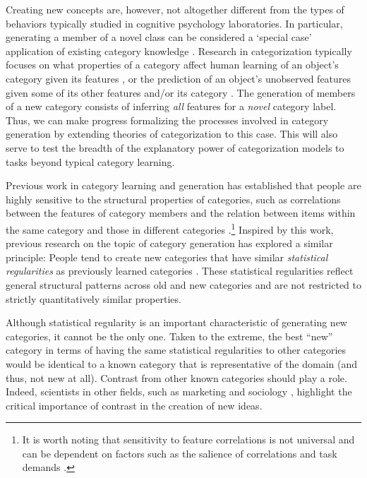 \documentclass[pdflatex,sn-apa]{sn-jnl}%
\theoremstyle{thmstyleone}%
\theoremstyle{thmstyletwo}%
\theoremstyle{thmstylethree}%
\begin{document}
Creating new concepts are, however, not altogether different from
the types of behaviors typically studied in cognitive psychology laboratories.
In particular, generating a member of a novel class can be considered a `special
case' application of existing category knowledge
\citep{kemp2014taxonomy,kurtz2015human}. Research in categorization typically
focuses on what properties of a category affect human learning of an object's
category given its features \citep{shepard1961learning,kurtz2013human}, or the
prediction of an object's unobserved features given some of its other features
and/or its category \citep{markman2003category}. The generation of members of a
new category consists of inferring {\em all} features for a {\em novel} category
label. Thus, we can make progress formalizing the processes involved in category
generation by extending theories of categorization to this case. This will also serve to test the breadth of the explanatory power of categorization models to tasks beyond typical category learning.

Previous work in category learning and generation has established that people
are highly sensitive to the structural properties of categories, such as
correlations between the features of category members and the relation between
items within the same category and those in different categories
\citep{roschmervis1975,regier2007,shepard1961learning,smith1995creative}.\footnote{It
  is worth noting that sensitivity to feature correlations is not universal and
  can be dependent on factors such as the salience of correlations and task
  demands \citep[e.g., see][]{chin2002effect,malt1984correlated,murphy2004big}.}
Inspired by this work, previous research on the topic of category generation has
explored a similar principle: People tend to create new categories that have
similar {\em statistical regularities} as previously learned categories
\citep{jern2013probabilistic,ward1994structured}. These statistical regularities
reflect general structural patterns across old and new categories and are not
restricted to strictly quantitatively similar properties. 

Although statistical regularity is an important characteristic of generating new
categories, it cannot be the only one. Taken to the extreme, the best ``new''
category in terms of having the same statistical regularities to other
categories would be identical to a known category that is representative of the
domain (and thus, not new at all). Contrast from other known categories should
play a role. Indeed, scientists in other fields, such as marketing
\citep{berger16} and sociology \citep{rogers03}, highlight the critical
importance of contrast in the creation of new ideas.
\end{document}
